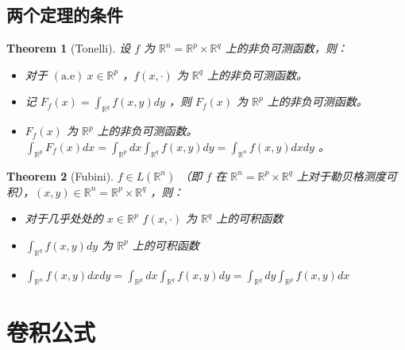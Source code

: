 \documentclass[linespread=1.5,openany]{book}%
\theoremstyle{plain}
\newtheorem{theorem}{Theorem}
\begin{document}
{{				\section{两个定理的条件}
				\begin{theorem}[Tonelli]
					设 \(f\) 为 \(\mathbb{R}^n=\mathbb{R}^p\times\mathbb{R}^q\) 上的非负可测函数，则：
					\begin{itemize}
						\item[(i)]对于 \((\text{a.e}) \ x\in\mathbb{R}^p\) ，\(f(x,\cdot)\) 为 \(\mathbb{R}^q\) 上的非负可测函数。 
						\item[(ii)] 记 \(F_f(x)=\int_{\mathbb{R}^q}f(x,y)dy\) ，则 \(F_f(x)\) 为 \(\mathbb{R}^p\) 上的非负可测函数。 \item[(iii)]\(F_f(x)\) 为 \(\mathbb{R}^p\) 上的非负可测函数。
						\(\int_{\mathbb{R}^p}F_f(x)dx=\int_{\mathbb{R}^p}dx\int_{\mathbb{R}^q}f(x,y)dy = \int_{\mathbb{R}^n}f(x,y)dxdy\) 。
					\end{itemize}
				\end{theorem}
				\begin{theorem}[Fubini]
					\(f\in L(\mathbb{R}^n)\) （即 \(f\) 在 \(\mathbb{R}^n=\mathbb{R}^p\times\mathbb{R}^q\) 上对于勒贝格测度可积），\((x,y)\in\mathbb{R}^n=\mathbb{R}^p\times\mathbb{R}^q\) ，则：
					\begin{itemize}
						\item[(i)]对于几乎处处的 \(x\in\mathbb{R}^p\) \(f(x,\cdot)\) 为 \(\mathbb{R}^q\) 上的可积函数
						\item[(ii)] \(\int_{\mathbb{R}^q}f(x,y)dy\) 为 \(\mathbb{R}^p\) 上的可积函数
						\item[(iii)]\(\int_{\mathbb{R}^n}f(x,y)dxdy=\int_{\mathbb{R}^p}dx\int_{\mathbb{R}^q}f(x,y)dy=\int_{\mathbb{R}^q}dy\int_{\mathbb{R}^p}f(x,y)dx\)
					\end{itemize}
				\end{theorem}
			}
			\chapter{卷积公式}{
}}
\end{document}

